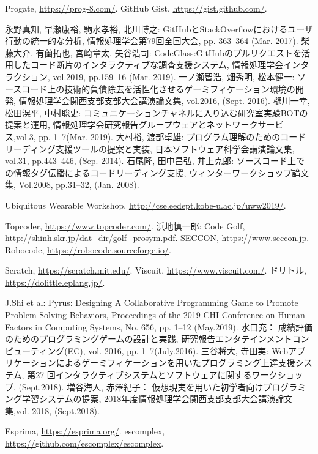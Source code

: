 \begin{thebibliography}{99}
	
	Progate, \url{https://prog-8.com/}.
	GitHub Gist, \url{https://gist.github.com/}.

	永野真知, 早瀬康裕, 駒水孝裕, 北川博之: GitHubとStackOverflowにおけるユーザ行動の統一的な分析, 情報処理学会第79回全国大会, pp. 363–364 (Mar. 2017).
	柴藤大介, 有薗拓也, 宮崎章太, 矢谷浩司: CodeGlass:GitHubのプルリクエストを活用したコード断片のインタラクティブな調査支援システム, 情報処理学会インタラクション, vol.2019, pp.159–16 (Mar. 2019).
	一ノ瀬智浩, 畑秀明, 松本健一: ソースコード上の技術的負債除去を活性化させるゲーミフィケーション環境の開発, 情報処理学会関西支部支部大会講演論文集, vol.2016, (Sept. 2016).
	樋川一幸, 松田滉平, 中村聡史: コミュニケーションチャネルに入り込む研究室実験BOTの提案と運用, 情報処理学会研究報告グループウェアとネットワークサービス,vol.3, pp. 1–7(Mar. 2019).
	大村裕, 渡部卓雄: プログラム理解のためのコードリーディング支援ツールの提案と実装, 日本ソフトウェア科学会講演論文集, vol.31, pp.443–446, (Sep. 2014).
	石尾隆, 田中昌弘, 井上克郎: ソースコード上での情報タグ伝播によるコードリーディング支援, ウィンターワークショップ論文集, Vol.2008, pp.31–32, (Jan. 2008).

	Ubiquitous Wearable Workshop, \url{http://cse.eedept.kobe-u.ac.jp/uww2019/}.

	Topcoder, \url{https://www.topcoder.com/}.
	浜地慎一郎: Code Golf, \url{http://shinh.skr.jp/dat_dir/golf_prosym.pdf}.
	SECCON, \url{https://www.seccon.jp}.
	Robocode, \url{https://robocode.sourceforge.io/}.

	Scratch, \url{https://scratch.mit.edu/}.
	Viscuit, \url{https://www.viscuit.com/}.
	ドリトル, \url{https://dolittle.eplang.jp/}.


	J.Shi et al: Pyrus: Designing A Collaborative Programming Game to Promote Problem Solving Behaviors, Proceedings of the 2019 CHI Conference on Human Factors in Computing Systems, No. 656, pp. 1–12 (May.2019).
	水口充： 成績評価のためのプログラミングゲームの設計と実践, 研究報告エンタテインメントコンピューティング(EC), vol. 2016, pp. 1–7(July.2016).
	三谷将大, 寺田実: Webアプリケーションによるゲーミフィケーションを用いたプログラミング上達支援システム, 第27 回インタラクティブシステムとソフトウェアに関するワークショップ, (Sept.2018).
	増谷海人, 赤澤紀子： 仮想現実を用いた初学者向けプログラミング学習システムの提案, 2018年度情報処理学会関西支部支部大会講演論文集,vol. 2018, (Sept.2018).

	Esprima, \url{https://esprima.org/}.
	escomplex, \url{https://github.com/escomplex/escomplex}.

\end{thebibliography}